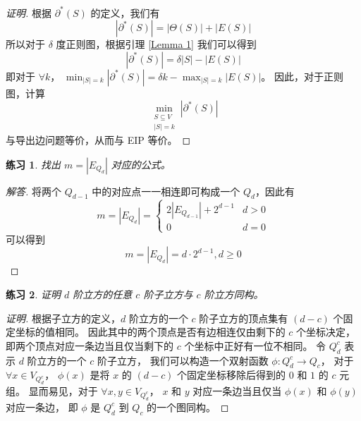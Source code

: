 \documentclass[12pt, a4paper]{article}
\newtheorem{exercisewithanswer}{练习}
\newenvironment{answer}[1][Answer]{
	\begin{proof}[#1]
	\let\qed\relax
}{
	\end{proof}
}
\begin{document}
\begin{proof}[证明]
根据 $\partial^\ast(S)$ 的定义，我们有
\begin{equation*}
|\partial^\ast(S)| = |\Theta(S)| + |E(S)|
\end{equation*}
所以对于 $\delta$ 度正则图，根据引理 \ref{Lemma 1} 我们可以得到
\begin{equation*}
|\partial^\ast(S)| = \delta |S| - |E(S)|
\end{equation*}
即对于 $\forall k$，
$\min_{|S| = k} |\partial^\ast(S)| = \delta k - \max_{|S| = k} |E(S)|$。
因此，对于正则图，计算
\begin{equation*}
\min_{\substack{
	S \subseteq V \\
	|S| = k
}}|\partial^\ast(S)|
\end{equation*}
与导出边问题等价，从而与 EIP 等价。
\end{proof}

\begin{exercisewithanswer}
找出 $m = |E_{Q_d}|$ 对应的公式。
\end{exercisewithanswer}

\begin{answer}[解答]
将两个 $Q_{d - 1}$ 中的对应点一一相连即可构成一个 $Q_d$，因此有
\begin{equation*}
m = |E_{Q_d}| = \begin{cases}
	2 \left|E_{Q_{d - 1}}\right| + 2^{d - 1} & d > 0 \\
	0                                        & d = 0
\end{cases}
\end{equation*}
可以得到
\begin{equation*}
m = |E_{Q_d}| = d \cdot 2^{d - 1}, d \ge 0
\end{equation*}
\end{answer}

\begin{exercisewithanswer}
证明 $d$ 阶立方的任意 $c$ 阶子立方与 $c$ 阶立方同构。
\end{exercisewithanswer}

\begin{proof}[证明]
根据子立方的定义，$d$ 阶立方的一个 $c$ 阶子立方的顶点集有 $(d - c)$ 个固定坐标的值相同。
因此其中的两个顶点是否有边相连仅由剩下的 $c$ 个坐标决定，
即两个顶点对应一条边当且仅当剩下的 $c$ 个坐标中正好有一位不相同。
令 $Q_d^c$ 表示 $d$ 阶立方的一个 $c$ 阶子立方，
我们可以构造一个双射函数 $\phi \colon Q_d^c \rightarrow Q_c$，
对于 $\forall x \in V_{Q_d^c}$，
$\phi(x)$ 是将 $x$ 的 $(d - c)$ 个固定坐标移除后得到的 $0$ 和 $1$ 的 $c$ 元组。
显而易见，对于 $\forall x, y \in V_{Q_d^c}$，
$x$ 和 $y$ 对应一条边当且仅当 $\phi(x)$ 和 $\phi(y)$ 对应一条边，
即 $\phi$ 是 $Q_d^c$ 到 $Q_c$ 的一个图同构。
\end{proof}
\end{document}
